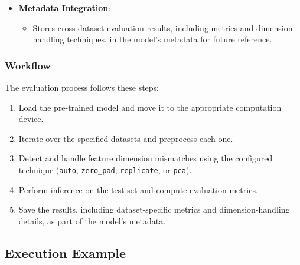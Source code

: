 {\begin{itemize}
		\item \textbf{Metadata Integration}:
		\begin{itemize}
			\item Stores cross-dataset evaluation results, including metrics and dimension-handling techniques, in the model's metadata for future reference.
		\end{itemize}
	\end{itemize}
	
	\subsubsection{Workflow}
	
	The evaluation process follows these steps:
	\begin{enumerate}
		\item Load the pre-trained model and move it to the appropriate computation device.
		\item Iterate over the specified datasets and preprocess each one.
		\item Detect and handle feature dimension mismatches using the configured technique (\texttt{auto}, \texttt{zero\_pad}, \texttt{replicate}, or \texttt{pca}).
		\item Perform inference on the test set and compute evaluation metrics.
		\item Save the results, including dataset-specific metrics and dimension-handling details, as part of the model's metadata.
	\end{enumerate}}
	
	\subsection{Execution Example}
